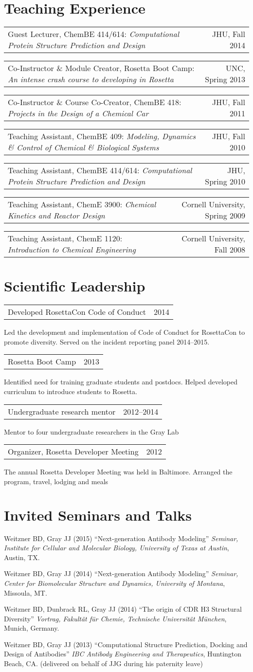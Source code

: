 \documentclass[11pt]{article}
\makeatletter
\newcommand{\allcapsspacing}[1]{{\addfontfeature{LetterSpace=7.5}#1}}
\newcommand{\leadershipitem}[3]{
\noindent
\begin{tabular*}{\textwidth}{@{\extracolsep{\fill}}lr}
		#1 & #2 \\
\end{tabular*}\newline#3\vspace{0.5\baselineskip}\par}
\newcommand{\yearitem}[2]{
\noindent
\begin{tabular*}{\textwidth}{@{\extracolsep{\fill}}lr}
		#1 & #2 \\
\end{tabular*}\vspace{0.3\baselineskip}}
\makeatother
\begin{document}
\section*{\allcapsspacing{Teaching Experience}}
\yearitem{Guest Lecturer, ChemBE 414/614: \textit{Computational Protein Structure Prediction and Design}}{JHU, Fall 2014}
\yearitem{Co-Instructor \& Module Creator, Rosetta Boot Camp: \textit{An intense crash course to developing in Rosetta}}{UNC, Spring 2013}
\yearitem{Co-Instructor \& Course Co-Creator, ChemBE 418: \textit{Projects in the Design of a Chemical Car}}{JHU, Fall 2011}
\yearitem{Teaching Assistant, ChemBE 409: \textit{Modeling, Dynamics \& Control of Chemical \& Biological Systems}}{JHU, Fall 2010}
\yearitem{Teaching Assistant, ChemBE 414/614: \textit{Computational Protein Structure Prediction and Design}}{JHU, Spring 2010}
\yearitem{Teaching Assistant, ChemE 3900: \textit{Chemical Kinetics and Reactor Design}}{Cornell University, Spring 2009}
\yearitem{Teaching Assistant, ChemE 1120: \textit{Introduction to Chemical Engineering}}{Cornell University, Fall 2008}

\section*{\allcapsspacing{Scientific Leadership}}
\leadershipitem{Developed RosettaCon Code of Conduct}{2014}{Led the development and implementation of Code of Conduct for RosettaCon to promote diversity. Served on the incident reporting panel 2014--2015.}
\leadershipitem{Rosetta Boot Camp}{2013}{Identified need for training graduate students and postdocs. Helped developed curriculum to introduce students to Rosetta.}
\leadershipitem{Undergraduate research mentor}{2012--2014}{Mentor to four undergraduate researchers in the Gray Lab}
\leadershipitem{Organizer, Rosetta Developer Meeting}{2012}{The annual Rosetta Developer Meeting was held in Baltimore. Arranged the program, travel, lodging and meals}

\section*{\allcapsspacing{Invited Seminars and Talks}}
\begin{etaremune}
\item Weitzner BD, Gray JJ (2015) ``Next-generation Antibody Modeling'' \textit{Seminar, Institute for Cellular and Molecular Biology, University of Texas at Austin}, Austin, TX.
\item Weitzner BD, Gray JJ (2014) ``Next-generation Antibody Modeling'' \textit{Seminar, Center for Biomolecular Structure and Dynamics, University of Montana}, Missoula, MT.
\item Weitzner BD, Dunbrack RL, Gray JJ (2014) ``The origin of CDR H3 Structural Diversity'' \textit{Vortrag, Fakult\"{a}t f\"{u}r Chemie, Technische Universit\"{a}t M\"{u}nchen}, Munich, Germany.
\item Weitzner BD, Gray JJ (2013) ``Computational Structure Prediction, Docking and Design of Antibodies'' \textit{IBC Antibody Engineering and Therapeutics}, Huntington Beach, CA. (delivered on behalf of JJG during his paternity leave)
\end{etaremune}
\end{document}
